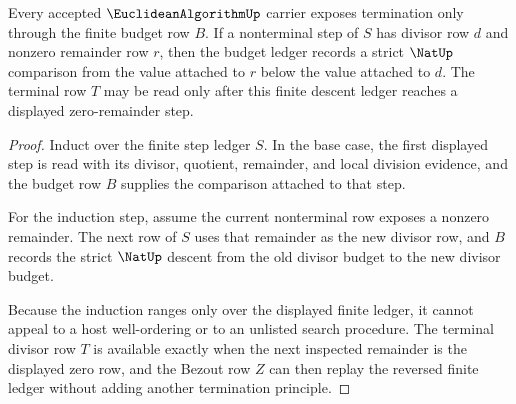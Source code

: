 \begin{theorem}
\label{thm:euclidean-algorithm-descent-budget}
Every accepted $\EuclideanAlgorithmUp$ carrier exposes termination only through the finite budget row $B$. If a nonterminal step of $S$ has divisor row $d$ and nonzero remainder row $r$, then the budget ledger records a strict $\NatUp$ comparison from the value attached to $r$ below the value attached to $d$. The terminal row $T$ may be read only after this finite descent ledger reaches a displayed zero-remainder step.
\end{theorem}
\begin{proof}
Induct over the finite step ledger $S$. In the base case, the first displayed step is read with its divisor, quotient, remainder, and local division evidence, and the budget row $B$ supplies the comparison attached to that step.

For the induction step, assume the current nonterminal row exposes a nonzero remainder. The next row of $S$ uses that remainder as the new divisor row, and $B$ records the strict $\NatUp$ descent from the old divisor budget to the new divisor budget.

Because the induction ranges only over the displayed finite ledger, it cannot appeal to a host well-ordering or to an unlisted search procedure. The terminal divisor row $T$ is available exactly when the next inspected remainder is the displayed zero row, and the Bezout row $Z$ can then replay the reversed finite ledger without adding another termination principle.
\end{proof}




